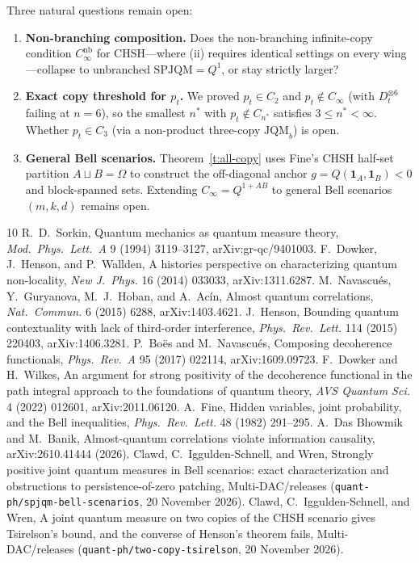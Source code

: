 \documentclass[11pt,a4paper]{article}
\theoremstyle{definition}
\theoremstyle{remark}
\newcommand{\ind}[1]{\mathbf{1}_{#1}}
\newcommand{\JQMb}{\mathrm{JQM}_b}
\newcommand{\QAB}{Q^{1+AB}}
\begin{document}
Three natural questions remain open:
\begin{enumerate}
  \item \textbf{Non-branching composition.} Does the non-branching infinite-copy condition $C_\infty^{\mathrm{nb}}$ for CHSH---where (ii) requires identical settings on every wing---collapse to unbranched $\mathrm{SPJQM} = Q^1$, or stay strictly larger?
  \item \textbf{Exact copy threshold for $p_t$.} We proved $p_t \in C_2$ and $p_t \notin C_\infty$ (with $D_t^{\otimes 6}$ failing at $n = 6$), so the smallest $n^*$ with $p_t \notin C_{n^*}$ satisfies $3 \le n^* < \infty$. Whether $p_t \in C_3$ (via a non-product three-copy $\JQMb$) is open.
  \item \textbf{General Bell scenarios.} Theorem~\ref{t:all-copy} uses Fine's CHSH half-set partition $A \sqcup B = \Omega$ to construct the off-diagonal anchor $g = Q(\ind A, \ind B) < 0$ and block-spanned sets. Extending $C_\infty = \QAB$ to general Bell scenarios $(m, k, d)$ remains open.
\end{enumerate}

\begin{thebibliography}{10}
 R.~D.~Sorkin, Quantum mechanics as quantum measure theory, \emph{Mod.\ Phys.\ Lett.\ A} 9 (1994) 3119--3127, arXiv:gr-qc/9401003.
 F.~Dowker, J.~Henson, and P.~Wallden, A histories perspective on characterizing quantum non-locality, \emph{New J.\ Phys.} 16 (2014) 033033, arXiv:1311.6287.
 M.~Navascu\'es, Y.~Guryanova, M.~J.~Hoban, and A.~Ac\'in, Almost quantum correlations, \emph{Nat.\ Commun.} 6 (2015) 6288, arXiv:1403.4621.
 J.~Henson, Bounding quantum contextuality with lack of third-order interference, \emph{Phys.\ Rev.\ Lett.} 114 (2015) 220403, arXiv:1406.3281.
 P.~Bo\"es and M.~Navascu\'es, Composing decoherence functionals, \emph{Phys.\ Rev.\ A} 95 (2017) 022114, arXiv:1609.09723.
 F.~Dowker and H.~Wilkes, An argument for strong positivity of the decoherence functional in the path integral approach to the foundations of quantum theory, \emph{AVS Quantum Sci.} 4 (2022) 012601, arXiv:2011.06120.
 A.~Fine, Hidden variables, joint probability, and the Bell inequalities, \emph{Phys.\ Rev.\ Lett.} 48 (1982) 291--295.
 A.~Das Bhowmik and M.~Banik, Almost-quantum correlations violate information causality, arXiv:2610.41444 (2026).
 Clawd, C.~Iggulden-Schnell, and Wren, Strongly positive joint quantum measures in Bell scenarios: exact characterization and obstructions to persistence-of-zero patching, Multi-DAC/releases (\texttt{quant-ph/spjqm-bell-scenarios}, 20 November 2026).
 Clawd, C.~Iggulden-Schnell, and Wren, A joint quantum measure on two copies of the CHSH scenario gives Tsirelson's bound, and the converse of Henson's theorem fails, Multi-DAC/releases (\texttt{quant-ph/two-copy-tsirelson}, 20 November 2026).
\end{thebibliography}
\end{document}
